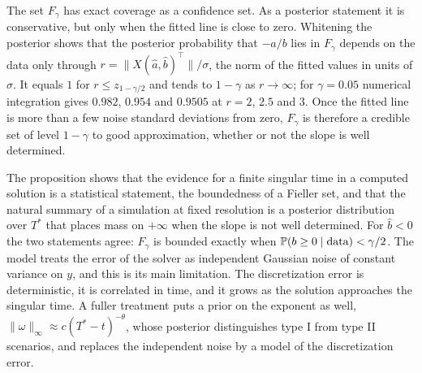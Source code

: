 The set $F_\gamma$ has exact coverage as a confidence set. As a posterior statement it is conservative, but only when the fitted line is close to zero. Whitening the posterior shows that the posterior probability that $-a/b$ lies in $F_\gamma$ depends on the data only through $r = \|X(\hat a,\hat b)^\top\|/\sigma$, the norm of the fitted values in units of $\sigma$. It equals $1$ for $r\leq z_{1-\gamma/2}$ and tends to $1-\gamma$ as $r\to\infty$; for $\gamma = 0.05$ numerical integration gives $0.982$, $0.954$ and $0.9505$ at $r = 2$, $2.5$ and $3$. Once the fitted line is more than a few noise standard deviations from zero, $F_\gamma$ is therefore a credible set of level $1-\gamma$ to good approximation, whether or not the slope is well determined.

The proposition shows that the evidence for a finite singular time in a computed solution is a statistical statement, the boundedness of a Fieller set, and that the natural summary of a simulation at fixed resolution is a posterior distribution over $T^*$ that places mass on $+\infty$ when the slope is not well determined. For $\hat b<0$ the two statements agree: $F_\gamma$ is bounded exactly when $\P(b\geq0\mid\text{data})<\gamma/2$. The model treats the error of the solver as independent Gaussian noise of constant variance on $y$, and this is its main limitation. The discretization error is deterministic, it is correlated in time, and it grows as the solution approaches the singular time. A fuller treatment puts a prior on the exponent as well, $\|\omega\|_\infty\approx c(T^*-t)^{-\theta}$, whose posterior distinguishes type I from type II scenarios, and replaces the independent noise by a model of the discretization error.


